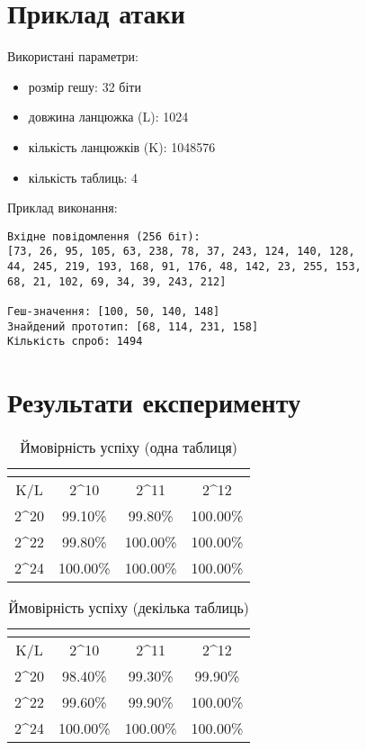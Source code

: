 \documentclass[12pt]{article}
\begin{document}
\section{Приклад атаки}

Використані параметри:
\begin{itemize}
  \item розмір гешу: 32 біти
  \item довжина ланцюжка (L): 1024
  \item кількість ланцюжків (K): 1048576
  \item кількість таблиць: 4
\end{itemize}

Приклад виконання:
\begin{verbatim}
Вхідне повідомлення (256 біт): 
[73, 26, 95, 105, 63, 238, 78, 37, 243, 124, 140, 128, 
44, 245, 219, 193, 168, 91, 176, 48, 142, 23, 255, 153, 
68, 21, 102, 69, 34, 39, 243, 212]

Геш-значення: [100, 50, 140, 148]
Знайдений прототип: [68, 114, 231, 158]
Кількість спроб: 1494
\end{verbatim}

\section{Результати експерименту}

\begin{table}[H]
\centering
\begin{tabular}{@{}c|ccc@{}}
\multicolumn{4}{c}{} \\
\midrule
K/L & 2^{10} & 2^{11} & 2^{12} \\
\midrule
2^{20} & 99.10\% & 99.80\% & 100.00\% \\
2^{22} & 99.80\% & 100.00\% & 100.00\% \\
2^{24} & 100.00\% & 100.00\% & 100.00\% \\
\bottomrule
\end{tabular}
\caption{Ймовірність успіху (одна таблиця)}
\end{table}

\begin{table}[H]
\centering
\begin{tabular}{@{}c|ccc@{}}
\multicolumn{4}{c}{} \\
\midrule
K/L & 2^{10} & 2^{11} & 2^{12} \\
\midrule
2^{20} & 98.40\% & 99.30\% & 99.90\% \\
2^{22} & 99.60\% & 99.90\% & 100.00\% \\
2^{24} & 100.00\% & 100.00\% & 100.00\% \\
\bottomrule
\end{tabular}
\caption{Ймовірність успіху (декілька таблиць)}
\end{table}
\end{document}
